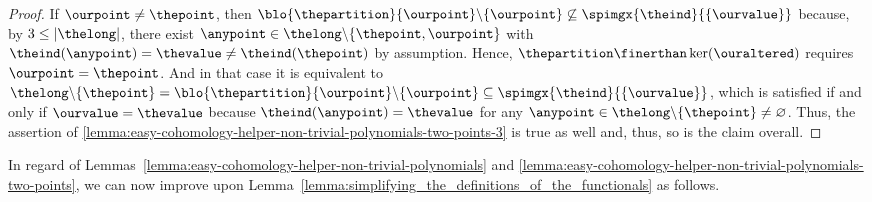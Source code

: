 \documentclass[pdftex]{sigma}
\numberwithin{equation}{section}
\begin{document}
{\begin{proof}
      If $\ourpoint\neq \thepoint$, then $\blo{\thepartition}{\ourpoint}\backslash \{\ourpoint\}\not\subseteq\spimgx{\theind}{\{\ourvalue\}}$ because, by $3\leq |\thelong|$, there exist $\anypoint\in\thelong\backslash \{\thepoint,\ourpoint\}$ with $\theind(\anypoint)=\thevalue\neq \theind(\thepoint)$ by assumption. Hence,  $\thepartition\finerthan \ker(\ouraltered)$ requires $\ourpoint=\thepoint$. And in that case it is equivalent to $\thelong\backslash \{\thepoint\}=\blo{\thepartition}{\ourpoint}\backslash \{\ourpoint\}\subseteq\spimgx{\theind}{\{\ourvalue\}}$, which is satisfied if and only if $\ourvalue=\thevalue$ because $\theind(\anypoint)=\thevalue$ for any $\anypoint\in\thelong\backslash\{\thepoint\}\neq\varnothing$. Thus,  the assertion of  \ref{lemma:easy-cohomology-helper-non-trivial-polynomials-two-points-3}  is true as well and, thus, so is the claim overall.
  \end{proof}
 }

In regard of Lem\-mas~\ref{lemma:easy-cohomology-helper-non-trivial-polynomials} and \ref{lemma:easy-cohomology-helper-non-trivial-polynomials-two-points}, we can now improve upon Lem\-ma~\ref{lemma:simplifying_the_definitions_of_the_functionals} as follows.
\end{document}
